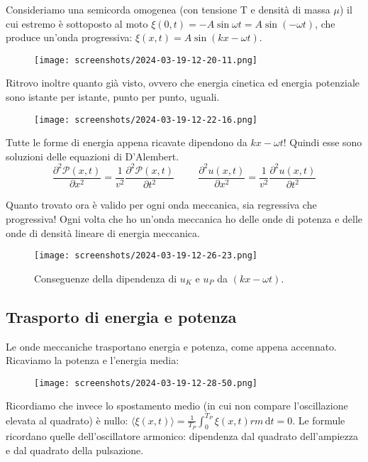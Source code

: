 \begin{eg}
	Consideriamo una semicorda omogenea (con tensione T e densità di massa \(\mu \)) il cui estremo è sottoposto al moto \(\xi (0,t) = -A \sin \omega t = A \sin (-\omega t)\), che produce un'onda progressiva: \(\xi (x,t) = A \sin (kx - \omega t)\).
	\begin{figure}[H]
		\centering
		\texttt{[image: screenshots/2024-03-19-12-20-11.png]}
	\end{figure}
	Ritrovo inoltre quanto già visto, ovvero che energia cinetica ed energia potenziale sono istante per istante, punto per punto, uguali.
	\begin{figure}[H]
		\centering
		\texttt{[image: screenshots/2024-03-19-12-22-16.png]}
	\end{figure}
	Tutte le forme di energia appena ricavate dipendono da \(kx-\omega t\)! Quindi esse sono soluzioni delle equazioni di D'Alembert.
	\[
		\frac{\partial ^{2} \mathcal{P} (x,t)}{\partial x^{2} } = \frac{1}{v^{2} }\frac{\partial ^{2} \mathcal{P} (x,t)}{\partial t^{2} } \hspace{1cm}
		\frac{\partial ^{2} u (x,t)}{\partial x^{2} } = \frac{1}{v^{2} }\frac{\partial ^{2} u(x,t)}{\partial t^{2} }  
	\]
\end{eg}
Quanto trovato ora è valido per ogni onda meccanica, sia regressiva che progressiva! Ogni volta che ho un'onda meccanica ho delle onde di potenza e delle onde di densità lineare di energia meccanica.
\begin{figure}[H]
	\centering
	\texttt{[image: screenshots/2024-03-19-12-26-23.png]}
	\caption{Conseguenze della dipendenza di \(u_K\) e \(u_P\) da \((kx-\omega t)\).}
\end{figure}

\subsection{Trasporto di energia e potenza}
Le onde meccaniche trasportano energia e potenza, come appena accennato. Ricaviamo la potenza e l'energia media:
\begin{figure}[H]
	\centering
	\texttt{[image: screenshots/2024-03-19-12-28-50.png]}
\end{figure}
Ricordiamo che invece lo spostamento medio (in cui non compare l'oscillazione elevata al quadrato) è nullo: \(\langle \xi (x,t)\rangle  = \frac{1}{T_P} \int_{0}^{T_P} \xi (x,t)rm  \,\mathrm{d}t =0\).
Le formule ricordano quelle dell'oscillatore armonico: dipendenza dal quadrato dell'ampiezza e dal quadrato della pulsazione.
